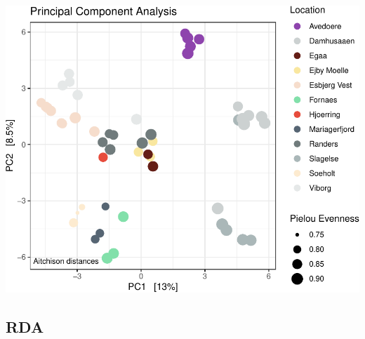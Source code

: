 \documentclass[
]{book}
\begin{document}
\includegraphics{gitbook-demo_files/figure-latex/PCA-1.pdf}

\hfill\break

\hypertarget{rda}{%
\subsection{RDA}\label{rda}}
\end{document}
